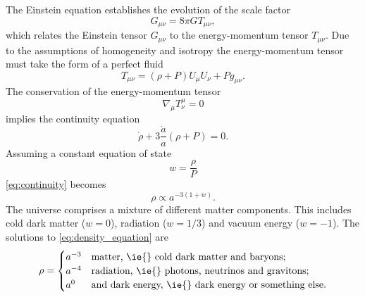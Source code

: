 The Einstein equation establishes the evolution of the scale factor
%
\begin{equation}\label{eq:einstein_tensor}
	G_{\mu\nu}
	= 8\pi G T_{\mu\nu},
\end{equation}
%
which relates the Einstein tensor \(G_{\mu\nu}\) to the energy-momentum tensor \(T_{\mu\nu}\).
Due to the assumptions of homogeneity and isotropy the energy-momentum tensor must take the form of a perfect fluid
%
\begin{equation}\label{eq:energy_momentum}
	T_{\mu\nu}
	= (\rho + P) U_{\mu} U_{\nu} + P g_{\mu\nu}.
\end{equation}
%
The conservation of the energy-momentum tensor
%
\begin{equation}
	\nabla_{\mu} T^{\mu}_{\nu}
	= 0
\end{equation}
%
implies the continuity equation
%
\begin{equation}\label{eq:continuity}
	\dot{\rho} + 3\frac{\dot{a}}{a}(\rho + P)
	= 0.
\end{equation}
%
Assuming a constant equation of state
%
\begin{equation}
	w
	= \frac{\rho}{P}
\end{equation}
%
\cref{eq:continuity} becomes
%
\begin{equation}\label{eq:density_equation}
	\rho
	\propto a^{-3(1+w)}.
\end{equation}
%
The universe comprises a mixture of different matter components.
This includes cold dark matter (\(w=0\)), radiation (\(w=1/3\)) and vacuum energy (\(w=-1\)).
The solutions to \cref{eq:density_equation} are
%
\begin{equation}
	\rho =
	\begin{cases}
		a^{-3} & \text{matter, \ie{} cold dark matter and baryons};           \\
		a^{-4} & \text{radiation, \ie{} photons, neutrinos and gravitons};    \\
		a^{0}  & \text{and dark energy, \ie{} dark energy or something else}.
	\end{cases}
\end{equation}

